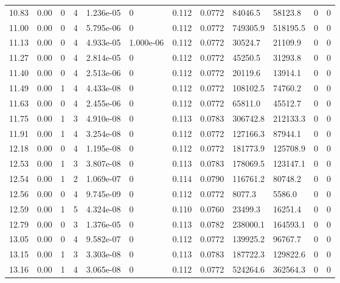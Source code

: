 \documentclass[preview]{standalone}
\begin{document}
{{{\begin{tabular}{L{1.2cm}C{1.2cm} C{0.3cm}C{0.5cm} C{1.4cm}C{1.4cm} C{1.4cm}C{1.4cm} C{1.6cm}C{1.6cm} C{1.6cm}C{1.6cm}}
  10.83  &  0.00  & 0     &  4 &  1.236e-05  & 0  &  0.112&   0.0772& 84046.5 & 58123.8   &  0 & 0  \\ 
  11.00  &  0.00  & 0     &  4 &  5.795e-06  & 0  &  0.112&   0.0772& 749305.9 & 518195.5   &  0 & 0  \\ 
  11.13  &  0.00  & 0     &  4 &  4.933e-05  & 1.000e-06  &  0.112&   0.0772& 30524.7 & 21109.9   &  0 & 0  \\ 
  11.27  &  0.00  & 0     &  4 &  2.814e-05  & 0  &  0.112&   0.0772& 45250.5 & 31293.8   &  0 & 0  \\ 
  11.40  &  0.00  & 0     &  4 &  2.513e-06  & 0  &  0.112&   0.0772& 20119.6 & 13914.1   &  0 & 0  \\ 
  11.49  &  0.00  & 1     &  4 &  4.433e-08  & 0  &  0.112&   0.0772& 108102.5 & 74760.2   &  0 & 0  \\ 
  11.63  &  0.00  & 0     &  4 &  2.455e-06  & 0  &  0.112&   0.0772& 65811.0 & 45512.7   &  0 & 0  \\ 
  11.75  &  0.00  & 1     &  3 &  4.910e-08  & 0  &  0.113&   0.0783& 306742.8 & 212133.3   &  0 & 0  \\ 
  11.91  &  0.00  & 1     &  4 &  3.254e-08  & 0  &  0.112&   0.0772& 127166.3 & 87944.1   &  0 & 0  \\ 
  12.18  &  0.00  & 0     &  4 &  1.195e-08  & 0  &  0.112&   0.0772& 181773.9 & 125708.9   &  0 & 0  \\ 
  12.53  &  0.00  & 1     &  3 &  3.807e-08  & 0  &  0.113&   0.0783& 178069.5 & 123147.1   &  0 & 0  \\ 
  12.54  &  0.00  & 1     &  2 &  1.069e-07  & 0  &  0.114&   0.0790& 116761.2 & 80748.2   &  0 & 0  \\ 
  12.56  &  0.00  & 0     &  4 &  9.745e-09  & 0  &  0.112&   0.0772& 8077.3 & 5586.0   &  0 & 0  \\ 
  12.59  &  0.00  & 1     &  5 &  4.324e-08  & 0  &  0.110&   0.0760& 23499.3 & 16251.4   &  0 & 0  \\ 
  12.79  &  0.00  & 0     &  3 &  1.376e-05  & 0  &  0.113&   0.0782& 238000.1 & 164593.1   &  0 & 0  \\ 
  13.05  &  0.00  & 0     &  4 &  9.582e-07  & 0  &  0.112&   0.0772& 139925.2 & 96767.7   &  0 & 0  \\ 
  13.15  &  0.00  & 1     &  3 &  3.303e-08  & 0  &  0.113&   0.0783& 187722.3 & 129822.6   &  0 & 0  \\ 
  13.16  &  0.00  & 1     &  4 &  3.065e-08  & 0  &  0.112&   0.0772& 524264.6 & 362564.3   &  0 & 0  \\ 

\end{tabular}}}}
\end{document}
